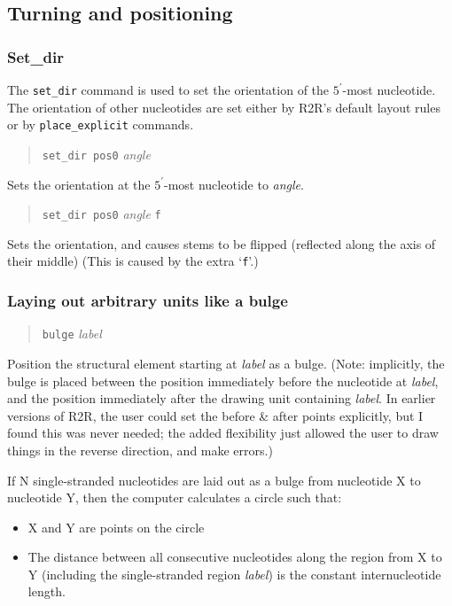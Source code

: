 \documentclass[letterpaper,12pt]{report}
\newcommand{\example}[1]{
\begin{quote}
{\raggedright
#1
}
\end{quote}
}
\begin{document}
\subsection{Turning and positioning}

\subsubsection{Set\_dir}
\label{sec:setdir}

The {\tt set\_dir} command is used to set the orientation of the $5^\prime$-most nucleotide.  The orientation of other nucleotides are set either by R2R's default layout rules or by {\tt place\_explicit} commands.

\example{{\tt set\_dir pos0} {\it angle}}

Sets the orientation at the $5^\prime$-most nucleotide to \textit{angle}.

\example{{\tt set\_dir pos0} \textit{angle } {\tt f}}

Sets the orientation, and causes stems to be flipped (reflected along
the axis of their middle)  (This is caused by the extra
{\textquoteleft}{\tt f}{\textquoteright}.)

\subsubsection{Laying out arbitrary units like a bulge}
\label{sec:bulge}

\example{{\tt bulge}\textit{ label }}

Position the structural element starting at {\it label} as a bulge. (Note: implicitly, the bulge is placed
between the position immediately before the nucleotide at {\it label}, and the position immediately
after the drawing unit containing {\it label}.  In earlier versions of R2R, the user could set the before
\& after points explicitly, but I found this was never needed; the
added flexibility just allowed the user to draw things in the reverse
direction, and make errors.)

If N single-stranded nucleotides are laid out as a bulge from nucleotide
X to nucleotide Y, then the computer calculates a circle such that:

\begin{itemize}
\item X and Y are points on the circle
\item The distance between all consecutive nucleotides along the region
from X to Y (including the single-stranded region \textit{label}) is
the constant internucleotide length.
\end{itemize}
\end{document}
